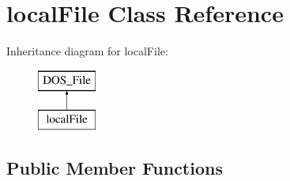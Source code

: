 \hypertarget{classlocalFile}{\section{local\-File Class Reference}
\label{classlocalFile}
}
Inheritance diagram for local\-File\-:\begin{figure}[H]
\begin{center}
\leavevmode
\includegraphics[height=2.000000cm]{classlocalFile}
\end{center}
\end{figure}
\subsection*{Public Member Functions}
